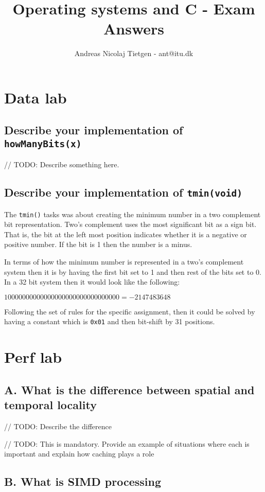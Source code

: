 \documentclass[11pt]{article}
\title{Operating systems and C - Exam Answers}
\author{Andreas Nicolaj Tietgen - ant@itu.dk}
\newcommand{\code}[1]{{\colorbox{lightgray!15}{\color{orange}\texttt{#1}}}}
\begin{document}
\maketitle

\section{Data lab}

\subsection{Describe your implementation of \code{howManyBits(x)}}
// TODO: Describe something here.

\subsection{Describe your implementation of \code{tmin(void)}}
The \code{tmin()} tasks was about creating the minimum number in a two complement bit representation.
Two's complement uses the most significant bit as a sign bit. That is, the bit at the left most position indicates whether 
it is a negative or positive number. If the bit is 1 then the number is a minus. 

In terms of how the minimum number is represented in a two's complement system then it is by having the first bit set to 1 and then rest of the bits set to 0.
In a 32 bit system then it would look like the following:

$1000 0000 0000 0000 0000 0000 0000 0000 = -2147483648$

Following the set of rules for the specific assignment, then it could be solved by having a constant which is \code{0x01}
and then bit-shift by 31 positions.   

\section{Perf lab}

\subsection{A. What is the difference between spatial and temporal locality}

// TODO: Describe the difference

// TODO: This is mandatory. Provide an example of situations where each is important and explain how caching plays a role

\subsection{B. What is SIMD processing}
\end{document}
